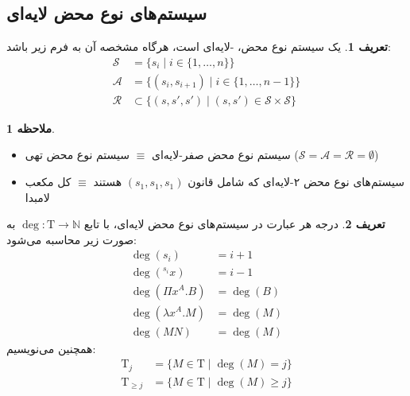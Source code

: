 \documentclass[11pt,twocolumn,a4paper,twoside]{article}
\theoremstyle{definition}
\newtheorem{definition}{تعریف}[section]
\theoremstyle{theorem}
\theoremstyle{definition}
\theoremstyle{definition}
\theoremstyle{definition}
\theoremstyle{definition}
\newtheorem{remark}{ملاحظه}[section]
\theoremstyle{definition}
\begin{document}
\subsection{سیستم‌های نوع محض لایه‌ای}

\begin{definition}\label{tpts_signature}
یک سیستم نوع محض، -لایه‌ای است، هرگاه مشخصه آن به فرم زیر باشد:
\vspace{-5pt}
\begin{align*}
\mathcal{S} &= \{ s_i \mid i \in \{1,\dots,n\} \}\\
\mathcal{A} &= \{ (s_i,s_{i+1}) \mid i \in \{1,\dots,n{-}1\} \}\\
\mathcal{R} &\subset \{ (s,s',s') \mid (s,s') \in \mathcal{S} \times \mathcal{S} \}
\end{align*}
\end{definition}

\begin{remark}
\hfil
\begin{itemize}[noitemsep, topsep=0pt]
  \item[-] سیستم نوع محض صفر-لایه‌ای $\equiv$ سیستم نوع محض تهی ($\mathcal{S}=\mathcal{A}=\mathcal{R}=\emptyset$)
  \item[-] سیستم‌های نوع محض ۲-لایه‌ای که شامل قانون $(s_1, s_1, s_1)$ هستند $\equiv$ کل مکعب لامبدا
\end{itemize}
\end{remark}

\begin{definition}
درجه هر عبارت در سیستم‌های نوع محض لایه‌ای، با تابع $\operatorname{deg}: \mathrm{T} \to \mathbb{N}$ به صورت زیر محاسبه می‌شود:
\vspace{-5pt}
\begin{align*}
\operatorname{deg}(s_i) &= i + 1\\
\operatorname{deg}(^{s_i}x) &= i - 1\\
\operatorname{deg}(\Pi x^A.B) &= \operatorname{deg}(B)\\
\operatorname{deg}(\lambda x^A.M) &= \operatorname{deg}(M)\\
\operatorname{deg}(MN) &= \operatorname{deg}(M)
\end{align*}
همچنین می‌نویسیم:
\vspace{-5pt}
\begin{align*}
\mathrm{T}_j &= \{M \in \mathrm{T} \mid \operatorname{deg}(M) = j\}\\
\mathrm{T}_{\ge j} &= \{M \in \mathrm{T} \mid \operatorname{deg}(M) \ge j\}
\end{align*}
\end{definition}
\end{document}
